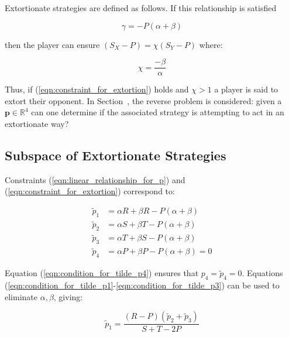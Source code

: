 \documentclass[a4paper]{article}
\begin{document}
Extortionate strategies are defined as follows. If this relationship is
satisfied

\begin{equation}\label{eqn:constraint_for_extortion}
    \gamma = - P(\alpha + \beta)
\end{equation}

then the player can ensure \((S_X - P)=\chi(S_Y-P)\) where:

\begin{equation}\label{eqn:definition_of_chi}
    \chi=\frac{-\beta}{\alpha}
\end{equation}

\noindent Thus, if (\ref{eqn:constraint_for_extortion}) holds and \(\chi >1\) a player is
said to extort their opponent.
In Section~\label{sec:subspace_of_extortionate_strategies}, the reverse problem is considered: given a
\(\textbf{p}\in\mathbb{R}^4\) can one determine if the associated strategy is attempting
to act in an extortionate way?

\subsection{Subspace of Extortionate Strategies}\label{sec:subspace_of_extortionate_strategies}

Constraints (\ref{eqn:linear_relationship_for_p}) and
(\ref{eqn:constraint_for_extortion}) correspond to:

\begin{align}
    \tilde p_1 & = \alpha R + \beta R - P (\alpha + \beta)
            \label{eqn:condition_for_tilde_p1}\\
    \tilde p_2 & = \alpha S + \beta T - P (\alpha + \beta)
            \label{eqn:condition_for_tilde_p2}\\
    \tilde p_3 & = \alpha T + \beta S - P (\alpha + \beta)
            \label{eqn:condition_for_tilde_p3}\\
    \tilde p_4 & = \alpha P + \beta P - P (\alpha + \beta) = 0
            \label{eqn:condition_for_tilde_p4}
\end{align}

Equation (\ref{eqn:condition_for_tilde_p4}) ensures that \(p_4=\tilde p_4=0\).
Equations (\ref{eqn:condition_for_tilde_p1}-\ref{eqn:condition_for_tilde_p3})
can be used to eliminate \(\alpha, \beta\), giving:

\begin{equation}\label{eqn:planar_definition_of_extortion}
    \tilde p_1 = \frac{(R - P)(\tilde p_2 + \tilde p_3)}{S + T - 2P}
\end{equation}
\end{document}
